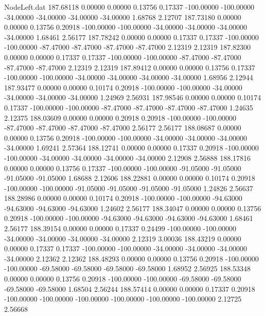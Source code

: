 \begin{filecontents}{NodeLeft.dat}
 187.68118    0.00000    0.00000     0.13756    0.17337 -100.00000 -100.00000  -34.00000  -34.00000  -34.00000  -34.00000    1.68768    2.12707
 187.73180    0.00000    0.00000     0.13756    0.20918 -100.00000 -100.00000  -34.00000  -34.00000  -34.00000  -34.00000    1.68461    2.56177
 187.78242    0.00000    0.00000     0.17337    0.17337 -100.00000 -100.00000  -87.47000  -87.47000  -87.47000  -87.47000    2.12319    2.12319
 187.82300    0.00000    0.00000     0.17337    0.17337 -100.00000 -100.00000  -87.47000  -87.47000  -87.47000  -87.47000    2.12319    2.12319
 187.89412    0.00000    0.00000     0.13756    0.17337 -100.00000 -100.00000  -34.00000  -34.00000  -34.00000  -34.00000    1.68956    2.12944
 187.93477    0.00000    0.00000     0.10174    0.20918 -100.00000 -100.00000  -34.00000  -34.00000  -34.00000  -34.00000    1.24969    2.56931
 187.98546    0.00000    0.00000     0.10174    0.17337 -100.00000 -100.00000  -87.47000  -87.47000  -87.47000  -87.47000    1.24635    2.12375
 188.03609    0.00000    0.00000     0.20918    0.20918 -100.00000 -100.00000  -87.47000  -87.47000  -87.47000  -87.47000    2.56177    2.56177
 188.08687    0.00000    0.00000     0.13756    0.20918 -100.00000 -100.00000  -34.00000  -34.00000  -34.00000  -34.00000    1.69241    2.57364
 188.12741    0.00000    0.00000     0.17337    0.20918 -100.00000 -100.00000  -34.00000  -34.00000  -34.00000  -34.00000    2.12908    2.56888
 188.17816    0.00000    0.00000     0.13756    0.17337 -100.00000 -100.00000  -91.05000  -91.05000  -91.05000  -91.05000    1.68688    2.12606
 188.22881    0.00000    0.00000     0.10174    0.20918 -100.00000 -100.00000  -91.05000  -91.05000  -91.05000  -91.05000    1.24826    2.56637
 188.28986    0.00000    0.00000     0.10174    0.20918 -100.00000 -100.00000  -94.63000  -94.63000  -94.63000  -94.63000    1.24602    2.56177
 188.34047    0.00000    0.00000     0.13756    0.20918 -100.00000 -100.00000  -94.63000  -94.63000  -94.63000  -94.63000    1.68461    2.56177
 188.39154    0.00000    0.00000     0.17337    0.24499 -100.00000 -100.00000  -34.00000  -34.00000  -34.00000  -34.00000    2.12319    3.00036
 188.43219    0.00000    0.00000     0.17337    0.17337 -100.00000 -100.00000  -34.00000  -34.00000  -34.00000  -34.00000    2.12362    2.12362
 188.48293    0.00000    0.00000     0.13756    0.20918 -100.00000 -100.00000  -69.58000  -69.58000  -69.58000  -69.58000    1.68952    2.56925
 188.53348    0.00000    0.00000     0.13756    0.20918 -100.00000 -100.00000  -69.58000  -69.58000  -69.58000  -69.58000    1.68504    2.56244
 188.57414    0.00000    0.00000     0.17337    0.20918 -100.00000 -100.00000 -100.00000 -100.00000 -100.00000 -100.00000    2.12725    2.56668

\end{filecontents}
